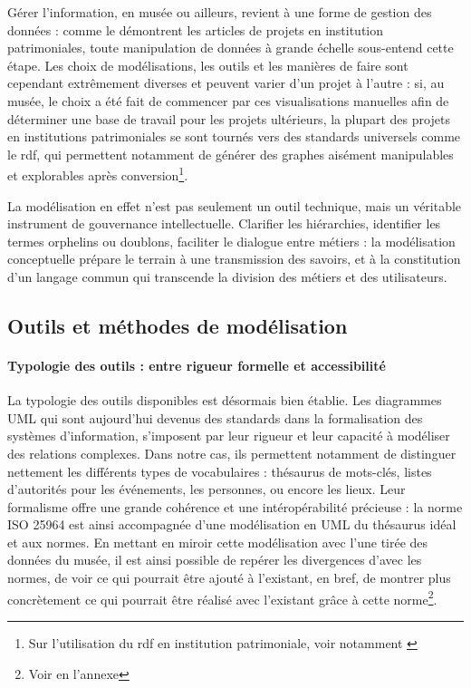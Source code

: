 Gérer l'information, en musée ou ailleurs, revient à une forme de gestion des données : comme le démontrent les articles de projets en institution patrimoniales, toute manipulation de données à grande échelle sous-entend cette étape. Les choix de modélisations, les outils et les manières de faire sont cependant extrêmement diverses et peuvent varier d'un projet à l'autre : si, au musée, le choix a été fait de commencer par ces visualisations manuelles afin de déterminer une base de travail pour les projets ultérieurs, la plupart des projets en institutions patrimoniales se sont tournés vers des standards universels comme le \gls{rdf}, qui permettent notamment de générer des graphes aisément manipulables et explorables après conversion\footnote{Sur l'utilisation du \gls{rdf} en institution patrimoniale, voir notamment \cite{bermesCasLierDonnees2013a,bermesConvergenceInteroperabiliteLapport2011,filabesLindexationRAMEAUAssistee2025,reichThesaurusAuGraphe2022}}.

La modélisation en effet n'est pas seulement un outil technique, mais un véritable instrument de gouvernance intellectuelle. Clarifier les hiérarchies, identifier les termes orphelins ou doublons, faciliter le dialogue entre métiers : la modélisation conceptuelle prépare le terrain à une transmission des savoirs, et à la constitution d’un langage commun qui transcende la division des métiers et des utilisateurs.

\subsection{Outils et méthodes de modélisation}

\paragraph*{Typologie des outils : entre rigueur formelle et accessibilité}
La typologie des outils disponibles est désormais bien établie. Les diagrammes UML qui sont aujourd'hui devenus des standards dans la formalisation des systèmes d'information, s'imposent par leur rigueur et leur capacité à modéliser des relations complexes. Dans notre cas, ils permettent notamment de distinguer nettement les différents types de vocabulaires : thésaurus de mots-clés, listes d'autorités pour les événements, les personnes, ou encore les lieux. Leur formalisme offre une grande cohérence et une intéropérabilité précieuse : la norme ISO 25964 est ainsi accompagnée d'une modélisation en UML du thésaurus idéal et aux normes. En mettant en miroir cette modélisation avec l'une tirée des données du musée, il est ainsi possible de repérer les divergences d'avec les normes, de voir ce qui pourrait être ajouté à l'existant, en bref, de montrer plus concrètement ce qui pourrait être réalisé avec l'existant grâce à cette norme\footnote{Voir en l'annexe }.

